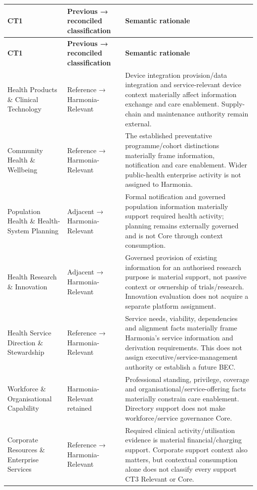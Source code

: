 \begin{longtable}{|>{\raggedright\arraybackslash}p{0.24\TableWidth}|>{\raggedright\arraybackslash}p{0.33\TableWidth}|>{\raggedright\arraybackslash}p{0.43\TableWidth}|}
\hline\rowcolor{TableHead}\textbf{CT1} & \textbf{Previous → reconciled classification} & \textbf{Semantic rationale}\\\hline\endfirsthead
\hline\rowcolor{TableHead}\textbf{CT1} & \textbf{Previous → reconciled classification} & \textbf{Semantic rationale}\\\hline\endhead
\hline\endfoot
05 Health Products \& Clinical Technology & Reference → Harmonia-Relevant & Device integration provision/\allowbreak{}data integration and service-relevant device context materially affect information exchange and care enablement. Supply-chain and maintenance authority remain external.\\\hline
07 Community Health \& Wellbeing & Reference → Harmonia-Relevant & The established preventative programme/\allowbreak{}cohort distinctions materially frame information, notification and care enablement. Wider public-health enterprise activity is not assigned to Harmonia.\\\hline
08 Population Health \& Health-System Planning & Adjacent → Harmonia-Relevant & Formal notification and governed population information materially support required health activity; planning remains externally governed and is not Core through context consumption.\\\hline
13 Health Research \& Innovation & Adjacent → Harmonia-Relevant & Governed provision of existing information for an authorised research purpose is material support, not passive context or ownership of trials/\allowbreak{}research. Innovation evaluation does not acquire a separate platform assignment.\\\hline
14 Health Service Direction \& Stewardship & Reference → Harmonia-Relevant & Service needs, viability, dependencies and alignment facts materially frame Harmonia’s service information and derivation requirements. This does not assign executive/\allowbreak{}service-management authority or establish a future BEC.\\\hline
15 Workforce \& Organisational Capability & Harmonia-Relevant retained & Professional standing, privilege, coverage and organisational/\allowbreak{}service-offering facts materially constrain care enablement. Directory support does not make workforce/\allowbreak{}service governance Core.\\\hline
16 Corporate Resources \& Enterprise Services & Reference → Harmonia-Relevant & Required clinical activity/\allowbreak{}utilisation evidence is material financial/\allowbreak{}charging support. Corporate support context also matters, but contextual consumption alone does not classify every support CT3 Relevant or Core.\\\hline

\end{longtable}
